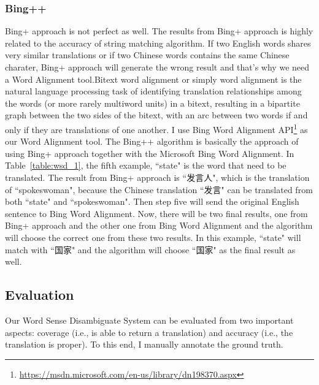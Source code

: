 \begin{CJK}{UTF8}{gbsn}
\subsubsection{Bing++}
Bing+ approach is not perfect as well. The results from Bing+ approach is highly related to the accuracy of string matching algorithm. If two English words shares very similar translations or if two Chinese words contains the same Chinese charater, Bing+ approach will generate the wrong result and that's why we need a Word Alignment tool.Bitext word alignment or simply word alignment is the natural language processing task of identifying translation relationships among the words (or more rarely multiword units) in a bitext, resulting in a bipartite graph between the two sides of the bitext, with an arc between two words if and only if they are translations of one another. I use Bing Word Alignment API\footnote{\url{https://msdn.microsoft.com/en-us/library/dn198370.aspx}} as our Word Alignment tool.
The Bing++ algorithm is basically the approach of using Bing+ approach together with the Microsoft Bing Word Alignment. In Table~\ref{table:wsd_1}, the fifth example, ``state" is the word that need to be translated. The result from Bing+ approach is ``发言人", which is the translation of ``spokeswoman", because the Chinese translation ``发言" can be translated from both ``state" and ``spokeswoman". Then step five will send the original English sentence to Bing Word Alignment. Now, there will be two final results, one from Bing+ approach and the other one from Bing Word Alignment and the algorithm will choose the correct one from these two results. In this example, ``state" will match with ``国家" and the algorithm will choose ``国家" as the final result as well.

\subsection{Evaluation}
Our Word Sense Disambiguate System can be evaluated from two important aspects: coverage (i.e., is able to return a translation) and accuracy (i.e., the translation is proper). To this end, I manually annotate the ground truth.



\end{CJK}
